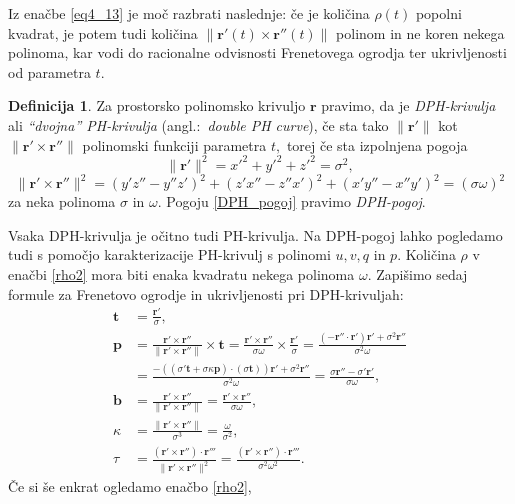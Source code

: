 \documentclass[12pt,a4paper,twoside]{article}
\theoremstyle{definition} %
\newtheorem{definicija}{Definicija}[section]
\theoremstyle{plain} %
\theoremstyle{primerstyle}
\numberwithin{equation}{section}  %
\newcommand{\tV}{\mathbf{t}}
\newcommand{\bV}{\mathbf{b}}
\newcommand{\pV}{\mathbf{p}}
\newcommand{\rV}{\mathbf{r}}
\begin{document}
Iz enačbe \eqref{eq4_13} je moč razbrati naslednje: če je količina $\rho(t)$ popolni kvadrat, je potem tudi količina $\lVert \rV'(t) \times \rV''(t) \rVert$ polinom in ne koren nekega polinoma, kar vodi do racionalne odvisnosti Frenetovega ogrodja ter ukrivljenosti od parametra $t.$
\begin{definicija}
	\label{dvojnaPH}
	Za prostorsko polinomsko krivuljo $\rV$ pravimo, da je \emph{DPH-krivulja} ali \emph{``dvojna'' PH-krivulja} (angl.:\ \emph{double PH curve}), če sta tako $\lVert \rV' \rVert$ kot $\lVert \rV' \times \rV'' \rVert$ polinomski funkciji parametra $t,$ torej če sta izpolnjena pogoja
	\begin{equation}
		\lVert \rV' \rVert^2=x'^2+y'^2+z'^2=\sigma^2,
	\end{equation}
	\begin{equation}
		\label{DPH_pogoj}
		\lVert \rV' \times \rV'' \rVert^2=(y'z''-y''z')^2+(z'x''-z''x')^2+(x'y''-x''y')^2=(\sigma \omega)^2
	\end{equation}
	za neka polinoma $\sigma$ in $\omega.$ Pogoju \eqref{DPH_pogoj} pravimo \emph{DPH-pogoj}.
\end{definicija}
Vsaka DPH-krivulja je očitno tudi PH-krivulja. Na DPH-pogoj lahko pogledamo tudi s pomočjo karakterizacije PH-krivulj s polinomi $u,v,q$ in $p.$ Količina $\rho$ v enačbi \eqref{rho2} mora biti enaka kvadratu nekega polinoma $\omega.$ Zapišimo sedaj formule za Frenetovo ogrodje in ukrivljenosti pri DPH-krivuljah:
\begin{align}
	\tV&=\frac{\rV'}{\sigma}, \nonumber \\
	\pV&=\frac{\rV'\times \rV''}{\lVert \rV'\times \rV'' \rVert} \times \tV =\frac{\rV'\times \rV''}{\sigma \omega}\times \frac{\rV'}{\sigma}=\frac{(-\rV'' \cdot \rV')\rV'+\sigma^2\rV''}{\sigma^2\omega} \nonumber \\
	&=\frac{-((\sigma'\tV+\sigma \kappa \pV)\cdot(\sigma\tV))\rV'+\sigma^2\rV''}{\sigma^2\omega}=\frac{\sigma\rV''-\sigma'\rV'}{\sigma\omega},\label{DPH_frenet_ukrv} \\
	\bV&=\frac{\rV'\times \rV''}{\lVert \rV'\times \rV'' \rVert}=\frac{\rV'\times \rV''}{\sigma\omega}, \nonumber \\
	\kappa &= \frac{\lVert \rV'\times \rV'' \rVert}{\sigma^3}=\frac{\omega}{\sigma^2}, \nonumber \\
	\tau &= \frac{(\rV'\times\rV'')\cdot\rV'''}{\lVert \rV'\times \rV'' \rVert^2}=\frac{(\rV'\times\rV'')\cdot\rV'''}{\sigma^2\omega^2}.\nonumber
\end{align}
Če si še enkrat ogledamo enačbo \eqref{rho2},
\end{document}
